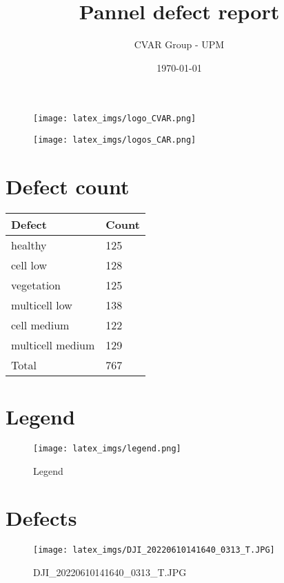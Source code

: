 \documentclass{article}%
\title{Pannel defect report}%
\author{CVAR Group {-} UPM}%
\date{\today}%
\begin{document}
%
\normalsize%
\maketitle%


\begin{figure}[h!]%
\centering%
\texttt{[image: latex\_imgs/logo\_CVAR.png]}%
\end{figure}

%


\begin{figure}[h!]%
\centering%
\texttt{[image: latex\_imgs/logos\_CAR.png]}%
\end{figure}

%
\newpage%
\tableofcontents%
\newpage%
\section{Defect count}%
\label{sec:Defectcount}%
\begin{longtable}{|l|l|}%
\hline%
Defect&Count\\%
\hline%
\endhead%
\hline%
healthy&125\\%
cell low&128\\%
vegetation&125\\%
multicell low&138\\%
cell medium&122\\%
multicell medium&129\\%
\hline%
Total&767\\%
\hline%
\end{longtable}

%
\newpage%
\section{Legend}%
\label{sec:Legend}%


\begin{figure}[h!]%
\centering%
\texttt{[image: latex\_imgs/legend.png]}%
\caption{Legend}%
\end{figure}

%
\newpage%
\section{Defects}%
\label{sec:Defects}%


\begin{figure}[h!]%
\centering%
\texttt{[image: latex\_imgs/DJI\_20220610141640\_0313\_T.JPG]}%
\caption{DJI\_20220610141640\_0313\_T.JPG}%
\end{figure}
\end{document}
